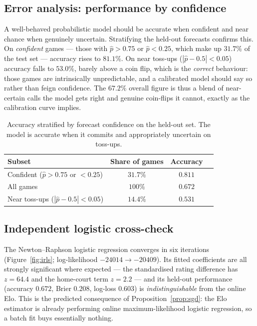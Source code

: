 \documentclass[11pt]{article}
\begin{document}
\subsection{Error analysis: performance by confidence}
A well-behaved probabilistic model should be accurate when confident and
near chance when genuinely uncertain. Stratifying the held-out forecasts confirms
this. On \emph{confident} games --- those with $\hat p > 0.75$ or $\hat p < 0.25$,
which make up $31.7\%$ of the test set --- accuracy rises to $81.1\%$. On near
toss-ups ($|\hat p - 0.5| < 0.05$) accuracy falls to $53.0\%$, barely above a coin
flip, which is the \emph{correct} behaviour: those games are intrinsically
unpredictable, and a calibrated model should say so rather than feign confidence.
The $67.2\%$ overall figure is thus a blend of near-certain calls the model gets
right and genuine coin-flips it cannot, exactly as the calibration curve implies.

\begin{table}[h]
\centering
\begin{tabular}{lccc}
\toprule
Subset & Share of games & Accuracy \\
\midrule
Confident ($\hat p>0.75$ or $<0.25$) & $31.7\%$ & $0.811$ \\
All games & $100\%$ & $0.672$ \\
Near toss-ups ($|\hat p-0.5|<0.05$) & $14.4\%$ & $0.531$ \\
\bottomrule
\end{tabular}
\caption{Accuracy stratified by forecast confidence on the held-out set. The model
is accurate when it commits and appropriately uncertain on toss-ups.}
\label{tab:conf}
\end{table}

\subsection{Independent logistic cross-check}
The Newton--Raphson logistic regression converges in six iterations
(Figure~\ref{fig:irls}; log-likelihood $-24014 \to -20409$). Its fitted
coefficients are all strongly significant where expected --- the standardised
rating difference has $z = 64.4$ and the home-court term $z = 2.2$ --- and its
held-out performance (accuracy $0.672$, Brier $0.208$, log-loss $0.603$) is
\emph{indistinguishable} from the online Elo. This is the predicted consequence of
Proposition~\ref{prop:sgd}: the Elo estimator is already performing online
maximum-likelihood logistic regression, so a batch fit buys essentially nothing.
\end{document}
